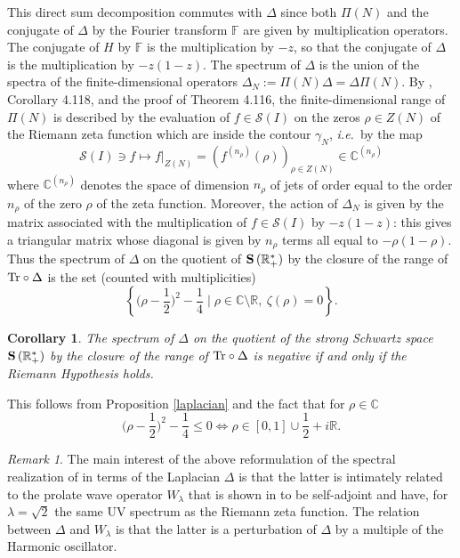 \documentclass{pspum-l}
\newtheorem{corollary}[theorem]{Corollary}
\theoremstyle{definition}
\theoremstyle{remark}
\newtheorem{remark}[theorem]{Remark}
\numberwithin{equation}{section}
\newcommand{\ie}{{\it i.e.\/}\ }
\def\C{{\mathbb C}}
\def\F{{\mathbb F}}
\def\R{{\mathbb R}}
\def\cS{{\mathcal S}}
\def\tr{{\rm Tr}}
\def\fourier{\F}
\def\strong{{\bf S\,}}
\begin{document}
This direct sum decomposition commutes with  $\Delta$ since both $\Pi(N)$ and the conjugate of $\Delta$ by the Fourier transform $\fourier$ are given by multiplication operators.  The conjugate of $H$  by  $\fourier$ is the multiplication by $-z$, so that the conjugate of $\Delta$ is the multiplication by $-z(1-z)$. 
The spectrum of $\Delta$ is the union of the spectra of the finite-dimensional operators $\Delta_N:=\Pi(N)\Delta=\Delta\Pi(N)$. By \cite{CMbook}, Corollary 4.118, and the proof of Theorem 4.116, the finite-dimensional range of $\Pi(N)$ is described by the evaluation of $f\in \cS(I)$  on the zeros $\rho\in Z(N)$ of the Riemann zeta function which are inside the contour $\gamma_N$, \ie by the map 
\begin{equation*}\label{evalmaprho}
\cS(I)\ni f\mapsto f|_{Z(N)}=(f^{(n_\rho)}(\rho))_{\rho\in Z(N)}\in \C^{(n_\rho)} 
\end{equation*}
where $\C^{(n_\rho)}$ denotes the space of dimension
$n_\rho$ of jets of order equal to the order $n_\rho$ of the zero $\rho$ of the zeta function. Moreover, the action of $\Delta_N$ is given by the matrix associated with the multiplication of $f\in \cS(I)$ by $-z(1-z)$:  this gives a triangular matrix whose diagonal is given by $n_\rho$ terms all equal to $-\rho(1-\rho)$. Thus 
  the spectrum of $\Delta$ on the quotient of  $\strong(\R_+^*)$ by the closure of the range of  $\tr\circ \Delta$ is the set (counted with multiplicities)
  \[
  \left\{\Big(\rho-\frac 12\Big)^2-\frac 14\mid \rho\in \C\setminus \R, \ \zeta(\rho)=0\right\}.
  \]
  \endproof 
  
\begin{corollary}\label{rhequiv} The spectrum of $\Delta$ on the quotient of the strong Schwartz space $\strong(\R_+^*)$ by the closure of the range of  $\tr\circ \Delta$ is negative if and only if the Riemann Hypothesis holds.	
\end{corollary}
\proof This follows from Proposition \ref{laplacian} and the fact that for $\rho \in \C$
\[
\Big(\rho-\frac 12\Big)^2 -\frac 14\leq 0 \iff \rho\in [0,1]\cup \frac 12 +i \R.
\]
 \endproof 
 
 \begin{remark}\label{prolate} The main interest of the above reformulation of the spectral realization of \cite{CCM2,CMbook} in terms of the Laplacian $\Delta$ is that the latter is intimately related to the prolate wave operator $W_\lambda$ that is shown in \cite{CMo} to be self-adjoint and have, for $\lambda=\sqrt 2$ the same UV spectrum as the Riemann zeta function. The relation between  $\Delta$ and 	$W_\lambda$ is that the latter is a perturbation of $\Delta$ by a multiple of the Harmonic oscillator.
 \end{remark}
\end{document}
